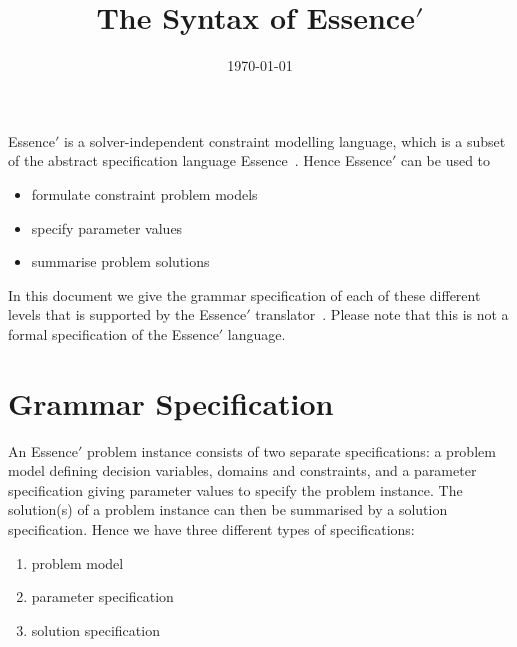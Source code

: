 \documentclass{article}
\begin{document}
\title{The Syntax of {\sc Essence}$'$} %



\date{\today}

\maketitle


{\sc Essence}$'$ is a solver-independent constraint modelling language,
which is a subset of the abstract specification language {\sc Essence}~\cite{essence}. 
Hence {\sc Essence}$'$ can be used to 

\begin{itemize}
\item formulate constraint problem models
\item specify parameter values
\item summarise problem solutions
\end{itemize}

In this document we give the grammar specification of each of these 
different levels that is supported by the {\sc Essence}$'$ translator~\cite{translator}.
Please note that this is not a formal specification of the 
{\sc Essence}$'$ language.


\section{Grammar Specification}

An {\sc Essence}$'$ problem instance 
consists of two separate specifications:
a problem model defining decision variables, domains and constraints, 
and a parameter specification giving parameter values to specify the
problem instance. The solution(s) of a problem instance can then
be summarised by a solution specification. Hence we have three different
types of specifications:

\begin{enumerate}
\item problem model
\item parameter specification
\item solution specification
\end{enumerate}
\end{document}

